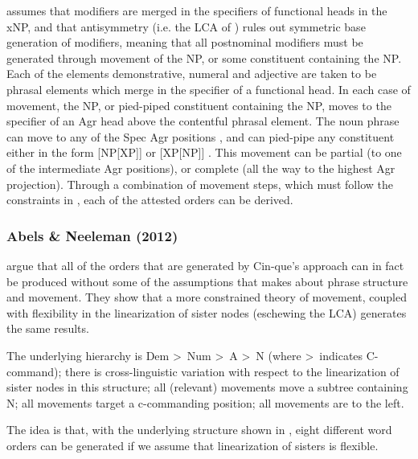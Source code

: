\documentclass[output=paper
,modfonts
,nonflat]{langsci/langscibook}
\begin{document}
\z

\citeauthor{Cinque2005} assumes that modifiers are merged in the specifiers of functional heads in the xNP, and that antisymmetry (i.e. the LCA of \citealt{Kayne1994})  rules out symmetric base generation of modifiers, meaning that all postnominal modifiers must be generated through movement of the NP, or some constituent containing the NP. Each of the elements demonstrative, numeral and adjective are taken to be phrasal elements which merge in the specifier of a functional head. In each case of movement, the NP, or pied-piped constituent containing the NP, moves to the specifier of an Agr head above the contentful phrasal element. The noun phrase can move to any of the Spec Agr positions , and can pied-pipe any constituent either in the form [NP[XP]]  or [XP[NP]] . This movement can be partial (to one of the intermediate Agr positions), or complete (all the way to the highest Agr projection). Through a combination of movement steps, which must follow the constraints in , each of the attested orders can be derived.

\subsubsection{Abels \& Neeleman (2012)}

\citet{AbelsNeeleman2012} argue that all of the orders that are generated by Cin\hyp{}que's approach can in fact be produced without some of the assumptions that \citeauthor{Cinque2005} makes about phrase structure and movement. They show that a more constrained theory of movement, coupled with flexibility in the linearization of sister nodes (eschewing the LCA) generates the same results. 

\ea \label{ex:hall:57}
\ea The underlying hierarchy is Dem \textgreater\ Num \textgreater\ A \textgreater\ N (where \textgreater\ indicates C-command);
\ex there is cross-linguistic variation with respect to the linearization of sister nodes in this structure;
\ex all (relevant) movements move a subtree containing N;
\ex all movements target a c-commanding position;
\ex all movements are to the left.
\z 
\z

The idea is that, with the underlying structure shown in , eight different word orders can be generated if we assume that linearization of sisters is flexible.
\end{document}
